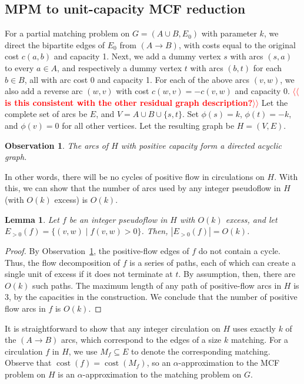 \documentclass[11pt]{article}
\makeatletter
\def\fsupply{\phi}
\theoremstyle{plain}
\newtheorem{lemma}{Lemma}
\newtheorem{observation}{Observation}
\def\cost{\operatorname{cost}}
\def\n@te#1{\textsf{\boldmath \textbf{$\langle\!\langle$#1$\rangle\!\rangle$}}\leavevmode}
\def\note#1{\textcolor{red}{\n@te{#1}}}
\makeatother
\begin{document}
\subsection{MPM to unit-capacity MCF reduction}
\label{subsection:mcm_mcf_reduction}

For a partial matching problem on $G = (A \cup B, E_0)$ with parameter $k$, we
direct the bipartite edges of $E_0$ from $(A \to B)$, with costs equal to the
original cost $c(a, b)$ and capacity 1.
Next, we add a dummy vertex $s$ with arcs $(s, a)$ to every $a \in A$,
and respectively a dummy vertex $t$ with arcs $(b, t)$ for each $b \in B$,
all with arc cost 0 and capacity 1.
For each of the above arcs $(v, w)$, we also add a reverse arc $(w, v)$ with
cost $c(w, v) = -c(v, w)$ and capacity 0. \note{is this consistent with the other residual graph description?}
Let the complete set of arcs be $E$, and $V = A \cup B \cup \{s, t\}$.
Set $\fsupply(s) = k$, $\fsupply(t) = -k$, and $\fsupply(v) = 0$ for all other
vertices.
Let the resulting graph be $H = (V, E)$.

\begin{observation}
\label{observation:dag}
	The arcs of $H$ with positive capacity form a directed acyclic graph.
\end{observation}

In other words, there will be no cycles of positive flow in circulations on
$H$.
With this, we can show that the number of arcs used by any integer pseudoflow
in $H$ (with $O(k)$ excess) is $O(k)$.

\begin{lemma}
\label{lemma:reduction_count}
Let $f$ be an integer pseudoflow in $H$ with $O(k)$ excess, and let
$E_{>0}(f) = \{(v, w) \mid f(v, w) > 0\}$.
Then, $|E_{>0}(f)| = O(k)$.
\end{lemma}

\begin{proof}
By Observation~\ref{observation:dag}, the positive-flow edges of $f$ do not
contain a cycle.
Thus, the flow decomposition of $f$ is a series of paths, each of which can
create a single unit of excess if it does not terminate at $t$.
By assumption, then, there are $O(k)$ such paths.
The maximum length of any path of positive-flow arcs in $H$ is 3, by the
capacities in the construction.
We conclude that the number of positive flow arcs in $f$ is $O(k)$.
\end{proof}

It is straightforward to show that any integer circulation on $H$ uses exactly
$k$ of the $(A \to B)$ arcs, which correspond to the edges of a size $k$
matching.
For a circulation $f$ in $H$, we use $M_f \subseteq E$ to denote the
corresponding matching.
Observe that $\cost(f) = \cost(M_f)$, so an $\alpha$-approximation to the MCF
problem on $H$ is an $\alpha$-approximation to the matching problem on $G$.
\end{document}
